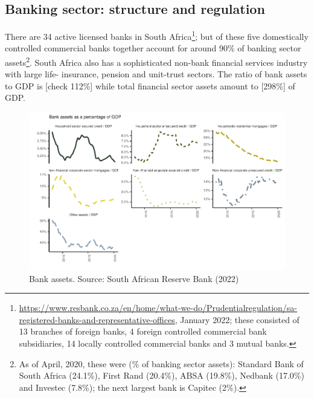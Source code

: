 \documentclass[
]{article}
\begin{document}
\hypertarget{banking-sector-structure-and-regulation}{%
\subsection{Banking sector: structure and regulation}\label{banking-sector-structure-and-regulation}}

There are 34 active licensed banks in South Africa\footnote{\url{https://www.resbank.co.za/en/home/what-we-do/Prudentialregulation/sa-registered-banks-and-representative-offices}, January 2022; these consisted of 13 branches of foreign banks, 4 foreign controlled commercial bank subsidiaries, 14 locally controlled commercial banks and 3 mutual banks.}; but of these five domestically controlled commercial banks together account for around 90\% of banking sector assets\footnote{As of April, 2020, these were (\% of banking sector assets): Standard Bank of South Africa (24.1\%), First Rand (20.4\%), ABSA (19.8\%), Nedbank (17.0\%) and Investec (7.8\%); the next largest bank is Capitec (2\%).}. South Africa also has a sophisticated non-bank financial services industry with large life- insurance, pension and unit-trust sectors. The ratio of bank assets to GDP is {[}check 112\%{]} while total financial sector assets amount to {[}298\%{]} of GDP.

\begin{figure}[H]

\includegraphics{Bank_capital_and_bank_lending_files/figure-latex/unnamed-chunk-2-1} \hfill{}

\caption{Bank assets. Source: South African Reserve Bank (2022)}\label{fig:unnamed-chunk-2}
\end{figure}
\end{document}
